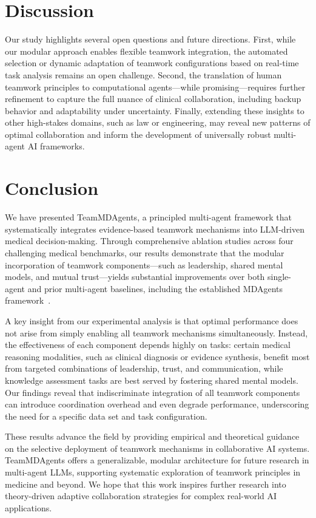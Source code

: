 \documentclass[letterpaper]{article} %
\begin{document}
\section{Discussion}
Our study highlights several open questions and future directions. First, while our modular approach enables flexible teamwork integration, the automated selection or dynamic adaptation of teamwork configurations based on real-time task analysis remains an open challenge. Second, the translation of human teamwork principles to computational agents—while promising—requires further refinement to capture the full nuance of clinical collaboration, including backup behavior and adaptability under uncertainty. Finally, extending these insights to other high-stakes domains, such as law or engineering, may reveal new patterns of optimal collaboration and inform the development of universally robust multi-agent AI frameworks.


\section{Conclusion}

We have presented TeamMDAgents, a principled multi-agent framework that systematically integrates evidence-based teamwork mechanisms into LLM-driven medical decision-making. Through comprehensive ablation studies across four challenging medical benchmarks, our results demonstrate that the modular incorporation of teamwork components—such as leadership, shared mental models, and mutual trust—yields substantial improvements over both single-agent and prior multi-agent baselines, including the established MDAgents framework~\citep{kim2024mdagents}.

A key insight from our experimental analysis is that optimal performance does not arise from simply enabling all teamwork mechanisms simultaneously. Instead, the effectiveness of each component depends highly on tasks: certain medical reasoning modalities, such as clinical diagnosis or evidence synthesis, benefit most from targeted combinations of leadership, trust, and communication, while knowledge assessment tasks are best served by fostering shared mental models. Our findings reveal that indiscriminate integration of all teamwork components can introduce coordination overhead and even degrade performance, underscoring the need for a specific data set and task configuration.

These results advance the field by providing empirical and theoretical guidance on the selective deployment of teamwork mechanisms in collaborative AI systems. TeamMDAgents offers a generalizable, modular architecture for future research in multi-agent LLMs, supporting systematic exploration of teamwork principles in medicine and beyond. We hope that this work inspires further research into theory-driven adaptive collaboration strategies for complex real-world AI applications.
\end{document}
